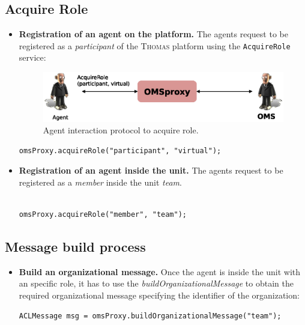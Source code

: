 \subsection{Acquire Role}
\begin{itemize}
\item \textbf{Registration of an agent on the platform.} The agents request to be registered as a \textit{participant} of the \textsc{Thomas} platform using the \lstinline|AcquireRole| service:
\begin{figure}[h!t]
	\centering
	\includegraphics[width=.8\textwidth]{Thomas/images/acquireRoleparticipant}
	\caption{Agent interaction protocol to acquire role.}
\end{figure}

\begin{lstlisting}
omsProxy.acquireRole("participant", "virtual");

\end{lstlisting}

\item \textbf{Registration of an agent inside the unit.}
The agents request to be registered as a \textit{member} inside the unit \textit{team}.


\begin{lstlisting}

omsProxy.acquireRole("member", "team");

\end{lstlisting}

\end{itemize}
\subsection{Message build process}
\begin{itemize}
\item \textbf{Build an organizational message.} Once the agent is inside the unit with an specific role, it has to use the \textit{buildOrganizationalMessage} to
obtain the required organizational message specifying the identifier of the organization:
\begin{lstlisting}
ACLMessage msg = omsProxy.buildOrganizationalMessage("team");
\end{lstlisting}
\end{itemize}

